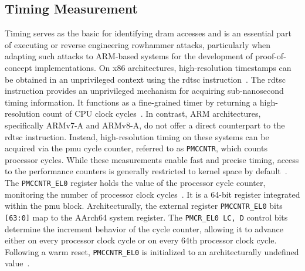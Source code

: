   \subsection{Timing Measurement} \label{subsec:timing-measurement}
    Timing serves as the basic for identifying \gls{dram} accesses and is an 
    essential part of executing or reverse engineering rowhammer attacks, particularly 
    when adapting such attacks to ARM-based systems for the development of proof-of-concept
    implementations. On x86 architectures, high-resolution timestamps can be obtained 
    in an unprivileged context using the \gls{rdtsc} instruction~\cite{toolKnockKnock, toolMemoryAware, toolBlacksmith, toolFlipfloyd}. The \gls{rdtsc} 
    instruction provides an unprivileged mechanism for acquiring sub-nanosecond timing information.
    It functions as a fine-grained timer by returning a high-resolution count of CPU clock cycles~\cite{docRDTSC}.
    In contrast, ARM architectures, specifically ARMv7-A and ARMv8-A, do not offer a 
    direct counterpart to the \gls{rdtsc} instruction. Instead, high-resolution timing on 
    these systems can be acquired via the \gls{pmu} cycle counter, 
    referred to as \texttt{PMCCNTR}, which counts processor cycles. While these measurements enable 
    fast and precise timing, access to the performance counters is generally restricted to 
    kernel space by default~\cite{thesisCacheAttacksandRH, thesisDRAMA}.
    \\
    The \texttt{PMCCNTR\_EL0} register holds the value of the processor cycle counter,
    monitoring the number of processor clock cycles~\cite{paperPMCCNTREL0}. It is a 64-bit register 
    integrated within the \gls{pmu} block. Architecturally, the external register 
    \texttt{PMCCNTR\_EL0} bits \texttt{[63:0]} map to the AArch64 system 
    register. The \texttt{PMCR\_EL0 {LC, D}} control bits determine the increment behavior of the cycle counter,
    allowing it to advance either on every processor clock cycle or on 
    every 64th processor clock cycle. Following a warm reset, \texttt{PMCCNTR\_EL0} is 
    initialized to an architecturally undefined value~\cite{paperPMCCNTREL0}.

